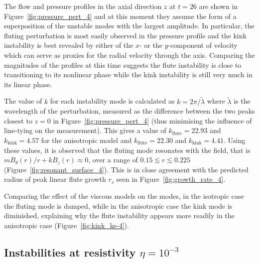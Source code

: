 \documentclass[fleqn,usenatbib]{mnras}
\newcommand{\rev}[1]{{\color{red} {#1}}}
\newcommand{\newold}[2]{{#1}{}}
\begin{document}
The \rev{flow and pressure profiles in the axial direction $z$} at
$t=26$ are shown in Figure~\ref{fig:pressure_pert_4} \rev{and at this
moment they assume the form of a superposition of the unstable modes
with the largest amplitude. In particular, the} fluting perturbation
  is most easily observed in the pressure \rev{profile and} \rev{\newold{}{ plotted
  as a function of $z$ following a line through the point $(r, \theta) = (0.101, 0)$.}} \rev{the} kink
instability is best revealed \rev{by either of the $x$- or
the $y$-component of} velocity which can serve as proxies for the radial
velocity through the axis. Comparing the magnitudes of the \rev{profiles} at
this time suggests the flute instability is close to transitioning to its
nonlinear phase while the kink instability is still very much in its linear
phase.

The value of $k$ for each \rev{instability mode} is calculated as $k
= 2\pi/\tilde{\lambda}$ where $\tilde{\lambda}$ is the wavelength of the
perturbation, measured as the difference between the two peaks closest
to $z=0$ \rev{in Figure~\ref{fig:pressure_pert_4}}
(thus minimising the influence of line-tying on the measurement). This gives
a value of $k_{\text{flute}}=22.93$ and $k_{\text{kink}}=4.57$ for the
anisotropic model and $k_{\text{flute}}=22.30$ and $k_{\text{kink}}=4.41$.
Using these values, it is observed that the fluting mode resonates with
the field, that is $m B_{\theta}(r)/r + kB_z(r) \approx 0$, over a range of
$0.15 \lesssim r \lesssim 0.225$ (Figure~\ref{fig:resonant_surface_4}). This is
in close agreement with the predicted radius of peak linear \rev{flute growth
$r_s$} seen in Figure~\ref{fig:growth_rate_4}.

Comparing the effect of the viscous models on the modes, \rev{in the
isotropic case the fluting mode is damped}, while in the anisotropic
case the kink mode is diminished, explaining why the flute instability
appears more readily in the anisotropic case (Figure~\ref{fig:kink_ke-4}).

\subsection{Instabilities at resistivity $\eta=10^{-3}$}
\end{document}
